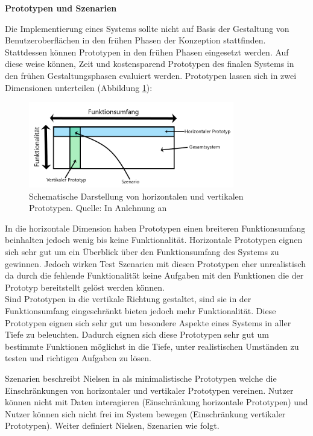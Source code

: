 \vspace{5mm} 
\textbf{Prototypen und Szenarien}

\cite[S.~93]{Nielsen1994} Die Implementierung eines Systems sollte nicht auf Basis der Gestaltung von Benutzeroberflächen in den frühen Phasen der Konzeption stattfinden. 
Stattdessen können Prototypen in den frühen Phasen eingesetzt werden. Auf diese weise können, Zeit und kostensparend Prototypen des finalen Systems in den frühen Gestaltungsphasen
evaluiert werden. Prototypen lassen sich in zwei Dimensionen unterteilen (Abbildung \ref{img:ver_hor_protptypes}): 

\begin{figure}[H]
	\centering
	\includegraphics[width=0.8\textwidth]{resources/fundamentals/hor_ver_prototypes.png}
	\caption{Schematische Darstellung von horizontalen und vertikalen Prototypen. Quelle: In Anlehnung an \cite[S.~94]{Nielsen1994}}
	\label{img:ver_hor_protptypes}
\end{figure}

In die horizontale Dimension haben Prototypen einen breiteren Funktionsumfang beinhalten jedoch wenig bis keine Funktionalität. Horizontale Prototypen eignen sich sehr gut um ein Überblick über den Funktionsumfang des Systems zu gewinnen. Jedoch wirken Test Szenarien mit diesen Prototypen eher unrealistisch da durch die fehlende Funktionalität keine Aufgaben mit den Funktionen die der Prototyp 
bereitstellt gelöst werden können.\\
Sind Prototypen in die vertikale Richtung gestaltet, sind sie in der Funktionsumfang eingeschränkt bieten jedoch mehr Funktionalität. Diese Prototypen eignen sich sehr gut um 
besondere Aspekte eines Systems in aller Tiefe zu beleuchten. Dadurch eignen sich diese Prototypen sehr gut um bestimmte Funktionen möglichst in die Tiefe, unter realistischen 
Umständen zu testen und richtigen Aufgaben zu lösen.

Szenarien beschreibt Nielsen in \cite[S.~99]{Nielsen1994} als minimalistische Prototypen welche die Einschränkungen von horizontaler und vertikaler Prototypen vereinen. 
Nutzer können nicht mit Daten interagieren (Einschränkung horizontale Prototypen) und Nutzer können sich nicht frei im System bewegen (Einschränkung vertikaler Prototypen).
 \cite[S.~100]{Nielsen1994}Weiter definiert Nielsen, Szenarien wie folgt. 
 
